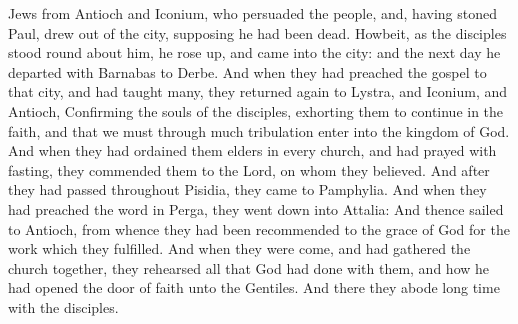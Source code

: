 {Jews
from
Antioch
and
Iconium,
who
persuaded the
people,
and, having
stoned
Paul,
drew
{} out
of the
city,
supposing
he had been
dead.
Howbeit, as the
disciples stood round
about
him, he rose
up, and
came
into the
city:
and the next
day he
departed
with
Barnabas
to
Derbe.
And when they had preached the
gospel to
that
city,
and had
taught
many, they returned
again
to
Lystra,
and
{}
Iconium,
and
Antioch,
Confirming the
souls of the
disciples,
{} exhorting
them to
continue in the
faith,
and
that
we
must
through
much
tribulation
enter
into the
kingdom of
God.
And when they had
ordained
them
elders in
every
church, and had
prayed
with
fasting, they
commended
them to the
Lord,
on
whom they
believed.
And after they had passed
throughout
Pisidia, they
came
to
Pamphylia.
And when they had
preached the
word
in
Perga, they went
down
into
Attalia:
And
thence
sailed
to
Antioch, from
whence they had
been
recommended to the
grace of
God
for the
work
which they
fulfilled.
And when they were
come,
and had
gathered the
church
together, they
rehearsed all
that
God had
done
with
them,
and
how he had
opened the
door of
faith unto the
Gentiles.
And
there they
abode
long
time
with the
disciples.

}
